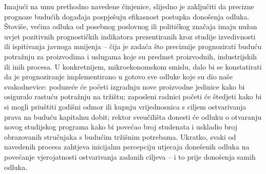 \documentclass[a4paper,12pt,oneside]{memoir}
\begin{document}
        Imajući na umu prethodno navedene činjenice, slijedno je zaključiti da precizne prognoze budućih događaja pospješuju efikasnost postupka donošenja odluka. Štoviše, većina odluka od posebnog poslovnog ili političkog značaja imaju nužan uvjet pozitivnih prognostičkih indikatora prezentiranih kroz studije izvedivnosti ili ispitivanja javnoga mnijenja -- čija je zadaća što preciznije prognozirati buduću potražnju za proizvodima i uslugama koje su predmet proizvodnih, industrijskih ili inih procesa. U konkretnijem, mikroekonomskom smislu, dalo bi se konstatirati da je prognoziranje implementirano u gotovo sve odluke koje su dio naše svakodnevice: poduzeće će početi izgradnju nove proizvodne jedinice kako bi osiguralo rastuću potražnju na tržištu; zaposleni radnici početi će štedjeti kako bi si mogli priuštiti godišni odmor ili kupnju vrijednosnica s ciljem ostvarivanja prava na buduću kapitalnu dobit; rektor sveučilišta donesti će odluku o otvaranju novog studijskog programa kako bi povećao broj studenata i uskladio broj obrazovanih stručnjaka s budućim tržišnim potrebama. Ukratko, svaki od navedenih procesa zahtjeva inicijalnu percepciju utjecaja donešenih odluka na povećanje vjerojatnosti ostvarivanja zadanih ciljeva -- i to prije donošenja samih odluka.
\end{document}
